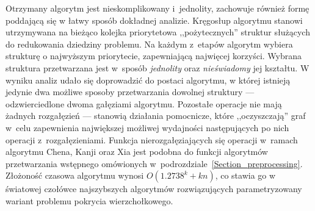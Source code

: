 \par {
  Otrzymany algorytm jest nieskomplikowany i~jednolity, zachowuje również formę poddającą się w łatwy sposób dokładnej analizie.
  Kręgosłup algorytmu stanowi utrzymywana na bieżąco kolejka priorytetowa ,,pożytecznych'' struktur służących do redukowania dziedziny problemu.
  Na każdym z~etapów algorytm wybiera strukturę o najwyższym priorytecie, zapewniającą najwięcej korzyści.
  Wybrana struktura przetwarzana jest w~sposób \emph{jednolity} oraz \emph{nieświadomy} jej kształtu.
  W wyniku analiz udało się doprowadzić do postaci algorytmu, w której istnieją jedynie dwa możliwe sposoby przetwarzania dowolnej struktury --- odzwierciedlone dwoma gałęziami algorytmu.
  Pozostałe operacje nie mają żadnych rozgałęzień --- stanowią działania pomocnicze, które ,,oczyszczają'' graf w~celu zapewnienia największej możliwej wydajności następujących po nich operacji z~rozgałęzieniami.
  Funkcja nierozgałęziających się operacji w~ramach algorytmu Chena, Kanji oraz Xia jest podobna do funkcji algorytmów przetwarzania wstępnego omówionych w~podrozdziale~\ref{Section_preprocessing}.\\
  Złożoność czasowa algorytmu wynosi $O(1.2738^k + kn)$, co stawia go w światowej czołówce najszybszych algorytmów rozwiązujących parametryzowany wariant problemu pokrycia wierzchołkowego.
}
